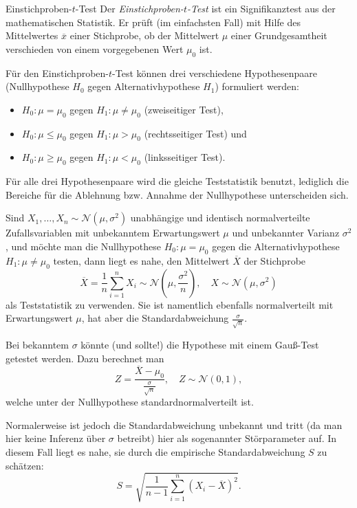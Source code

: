 \begin{defi}{Einstichproben-$t$-Test}
    Der \emph{Einstichproben-$t$-Test} ist ein Signifikanztest aus der mathematischen Statistik.
    Er prüft (im einfachsten Fall) mit Hilfe des Mittelwertes $\overline{x}$ einer Stichprobe, ob der Mittelwert $\mu$ einer Grundgesamtheit verschieden von einem vorgegebenen Wert $\mu_0$ ist.

    Für den Einstichproben-$t$-Test können drei verschiedene Hypothesenpaare (Nullhypothese $H_0$ gegen Alternativhypothese $H_1$) formuliert werden:
    \begin{itemize}
        \item $H_0: \mu = \mu_0$ gegen $H_1: \mu \neq \mu_0$ (zweiseitiger Test),
        \item $H_0: \mu \leq \mu_0$ gegen $H_1: \mu > \mu_0$ (rechtsseitiger Test) und
        \item $H_0: \mu \geq \mu_0$ gegen $H_1: \mu < \mu_0$ (linksseitiger Test).
    \end{itemize}

    Für alle drei Hypothesenpaare wird die gleiche Teststatistik benutzt, lediglich die Bereiche für die Ablehnung bzw. Annahme der Nullhypothese unterscheiden sich.

    Sind $X_1, \ldots, X_n \sim \mathcal{N}(\mu, \sigma^2)$ unabhängige und identisch normalverteilte Zufallsvariablen mit unbekanntem Erwartungswert $\mu$ und unbekannter Varianz $\sigma^2$, und möchte man die Nullhypothese $H_0: \mu = \mu_0$ gegen die Alternativhypothese $H_1: \mu \neq \mu_0$ testen, dann liegt es nahe, den Mittelwert $\overline{X}$ der Stichprobe
    \[
        \overline{X} = \frac{1}{n} \sum_{i = 1}^{n} X_i \sim \mathcal{N}(\mu, \frac{\sigma^2}{n}), \quad X \sim \mathcal{N}(\mu, \sigma^2)
    \]
    als Teststatistik zu verwenden.
    Sie ist namentlich ebenfalls normalverteilt mit Erwartungswert $\mu$, hat aber die Standardabweichung $\frac{\sigma}{\sqrt{n}}$.

    Bei bekanntem $\sigma$ könnte (und sollte!) die Hypothese mit einem Gauß-Test getestet werden.
    Dazu berechnet man
    \[
        Z = \frac{\overline{X} - \mu_0}{\frac{\sigma}{\sqrt{n}}}, \quad Z \sim \mathcal{N}(0, 1),
    \]
    welche unter der Nullhypothese standardnormalverteilt ist.

    Normalerweise ist jedoch die Standardabweichung unbekannt und tritt (da man hier keine Inferenz über $\sigma$ betreibt) hier als sogenannter Störparameter auf.
    In diesem Fall liegt es nahe, sie durch die empirische Standardabweichung $S$ zu schätzen:
    \[
        S = \sqrt{\frac{1}{n - 1} \sum_{i = 1}^{n} (X_i - \overline{X})^2}.
    \]


\end{defi}
